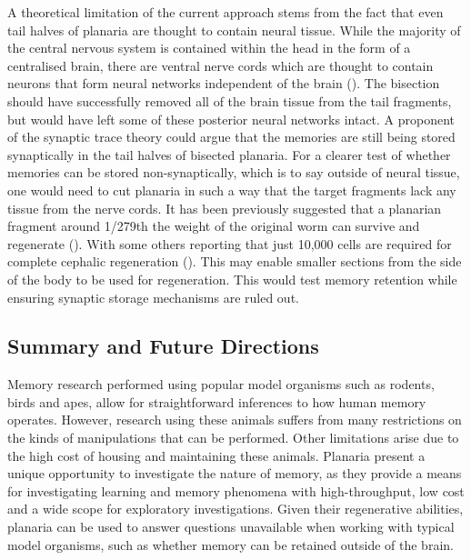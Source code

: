 \documentclass[
  jou,
  floatsintext,
  longtable,
  nolmodern,
  notxfonts,
  notimes,
  donotrepeattitle,
  colorlinks=true,linkcolor=blue,citecolor=blue,urlcolor=blue]{apa7}
\begin{document}
A theoretical limitation of the current approach stems from the fact
that even tail halves of planaria are thought to contain neural tissue.
While the majority of the central nervous system is contained within the
head in the form of a centralised brain, there are ventral nerve cords
which are thought to contain neurons that form neural networks
independent of the brain (). The bisection should have successfully removed all of the
brain tissue from the tail fragments, but would have left some of these
posterior neural networks intact. A proponent of the synaptic trace
theory could argue that the memories are still being stored synaptically
in the tail halves of bisected planaria. For a clearer test of whether
memories can be stored non-synaptically, which is to say outside of
neural tissue, one would need to cut planaria in such a way that the
target fragments lack any tissue from the nerve cords. It has been
previously suggested that a planarian fragment around 1/279th the weight
of the original worm can survive and regenerate
(). With some
others reporting that just 10,000 cells are required for complete
cephalic regeneration (). This may enable smaller sections from the side of the
body to be used for regeneration. This would test memory retention while
ensuring synaptic storage mechanisms are ruled out.

\subsection{Summary and Future
Directions}\label{sec-summary-and-future-directions}

Memory research performed using popular model organisms such as rodents,
birds and apes, allow for straightforward inferences to how human memory
operates. However, research using these animals suffers from many
restrictions on the kinds of manipulations that can be performed. Other
limitations arise due to the high cost of housing and maintaining these
animals. Planaria present a unique opportunity to investigate the nature
of memory, as they provide a means for investigating learning and memory
phenomena with high-throughput, low cost and a wide scope for
exploratory investigations. Given their regenerative abilities, planaria
can be used to answer questions unavailable when working with typical
model organisms, such as whether memory can be retained outside of the
brain.
\end{document}

